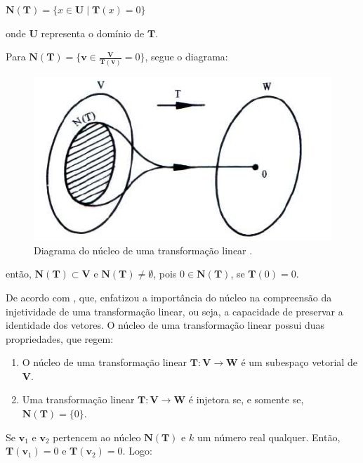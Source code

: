\centerline{$\mathbf{N}(\mathbf{T}) = \{x \in \mathbf{U} \mid \mathbf{T}(x) = 0\}$}

\noindent onde $\mathbf{U}$ representa o domínio de $\mathbf{T}$.

Para $\mathbf{N}(\mathbf{T}) = \{\mathbf{v} \in \frac{\mathbf{V}}{\mathbf{T}(\mathbf{v})} = 0\}$, segue o diagrama:

\begin{figure}[H]
	\centering
	\includegraphics[scale=1.00]{t_nucleo.png}
	\caption{Diagrama do núcleo de uma transformação linear \cite{steinbruch1987}.}
\end{figure}

\noindent então, $\mathbf{N}(\mathbf{T}) \subset \mathbf{V}$ e $\mathbf{N}(\mathbf{T}) \neq \emptyset$, pois $0 \in \mathbf{N}(\mathbf{T})$, se $\mathbf{T}(0) = 0$.

De acordo com \cite{lang2003}, que, enfatizou a importância do núcleo na compreensão da injetividade de uma transformação linear, ou seja, a capacidade de preservar a identidade dos vetores. O núcleo de uma transformação linear possui duas propriedades, que regem:

\begin{enumerate}
	\item O núcleo de uma transformação linear $\mathbf{T}: \mathbf{V} \longrightarrow \mathbf{W}$ é um subespaço vetorial de $\mathbf{V}$.
	\item Uma transformação linear $\mathbf{T}: \mathbf{V} \longrightarrow \mathbf{W}$ é injetora se, e somente se, $\mathbf{N}(\mathbf{T}) = \{0\}$.
\end{enumerate}

Se $\mathbf{v}_1$ e $\mathbf{v}_2$ pertencem ao núcleo $\mathbf{N}(\mathbf{T})$ e $k$ um número real qualquer. Então, $\mathbf{T}(\mathbf{v}_1) = 0$ e $\mathbf{T}(\mathbf{v}_2) = 0$. Logo:

